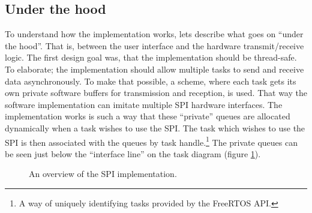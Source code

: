 \subsection{Under the hood}\label{sec:spi_underthehood}
To understand how the implementation works, lets describe what goes on ``under the hood''. That is, between the user interface and the hardware transmit/receive logic. The first design goal was, that the implementation should be thread-safe. To elaborate; the implementation should allow multiple tasks to send and receive data asynchronously. To make that possible, a scheme, where each task gets its own private software buffers for transmission and reception, is used. That way the software implementation can imitate multiple SPI hardware interfaces. The implementation works is such a way that these ``private'' queues are allocated dynamically when a task wishes to use the SPI. The task which wishes to use the SPI is then associated with the queues by task handle.\footnote{A way of uniquely identifying tasks provided by the FreeRTOS API.} The private queues can be seen just below the ``interface line'' on the task diagram (figure \ref{fig:spi_task_diagram}).

\begin{figure}[htb]
  \centering
  \caption{An overview of the SPI implementation.}
  \label{fig:spi_task_diagram}
\end{figure}%

